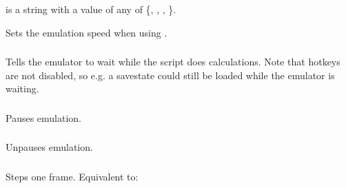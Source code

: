\documentclass[letterpaper,10pt,english]{sphinxmanual}
\begin{document}
\subsubsection{}
\label{\detokenize{mods:emu-speedmode-mode}}\label{\detokenize{mods:speedmode}}
\sphinxAtStartPar
{} is a string with a value of any of \{, , , \}.

\sphinxAtStartPar
Sets the emulation speed when using .


\subsubsection{}
\label{\detokenize{mods:emu-wait}}\label{\detokenize{mods:wait}}
\sphinxAtStartPar
Tells the emulator to wait while the script does calculations. Note that hotkeys are not disabled, so e.g. a savestate could still be loaded while the emulator is waiting.


\subsubsection{}
\label{\detokenize{mods:emu-pause}}\label{\detokenize{mods:pause}}
\sphinxAtStartPar
Pauses emulation.


\subsubsection{}
\label{\detokenize{mods:emu-unpause}}\label{\detokenize{mods:unpause}}
\sphinxAtStartPar
Unpauses emulation.


\subsubsection{}
\label{\detokenize{mods:emu-emulateframe}}\label{\detokenize{mods:emulateframe}}
\sphinxAtStartPar
Steps one frame. Equivalent to:

\begin{sphinxVerbatim}[commandchars=\\\{\}]
\end{sphinxVerbatim}
\end{document}
